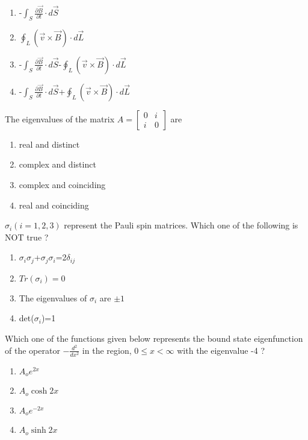     \begin{enumerate}
        \item -$\int_S \frac{\partial \overrightarrow{B}}{\partial t} \cdot d\overrightarrow{S}$
        \item $\oint_L (\overrightarrow{v} \times \overrightarrow{B}) \cdot d\overrightarrow{L}$
        \item -$\int_S \frac{\partial \overrightarrow{B}}{\partial t} \cdot d\overrightarrow{S}$-$\oint_L (\overrightarrow{v} \times \overrightarrow{B}) \cdot d\overrightarrow{L}$
        \item -$\int_S \frac{\partial \overrightarrow{B}}{\partial t} \cdot d\overrightarrow{S}$+$\oint_L (\overrightarrow{v} \times \overrightarrow{B}) \cdot d\overrightarrow{L}$
    \end{enumerate}
    \item The eigenvalues of the matrix $A= 
\begin{bmatrix}
0 & i \\
i & 0
\end{bmatrix}
$ are
    \begin{enumerate}
    \item real and distinct
    \item complex and distinct
    \item complex and coinciding
    \item real and coinciding
    \end{enumerate}
    \item $\sigma_i(i=1, 2, 3)$ represent the Pauli spin matrices. Which one of the following is NOT true ?
    \begin{enumerate}
        \item $\sigma_i \sigma_j$+$\sigma_j \sigma_i$=2$\delta_{ij}$
        \item $Tr(\sigma_i)=0$
        \item The eigenvalues of $\sigma_i$ are $\pm1$
        \item det($\sigma_i$)=1
    \end{enumerate}
    \item Which one of the functions given below represents the bound state eigenfunction of the operator $ - \frac{d^2}{dx^2} $ in the region, $0 \leq x < \infty$ with the eigenvalue -4 ? 
    \begin{enumerate}
    \item $A_o e^{2x}$
    \item $A_o \cosh{2x}$
    \item $A_o e^{-2x}$
    \item $A_o \sinh{2x}$
    \end{enumerate}
